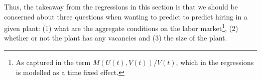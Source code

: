 Thus, the takeaway from the regressions in this section is that we should be concerned about three questions when wanting to predict to predict hiring in a given plant: (1) what are the aggregate conditions on the labor market\footnote{As captured in the term $M(U(t),V(t))/V(t)$, which in the regressions is modelled as a time fixed effect.}, (2) whether or not the plant has any vacancies and (3) the size of the plant.

